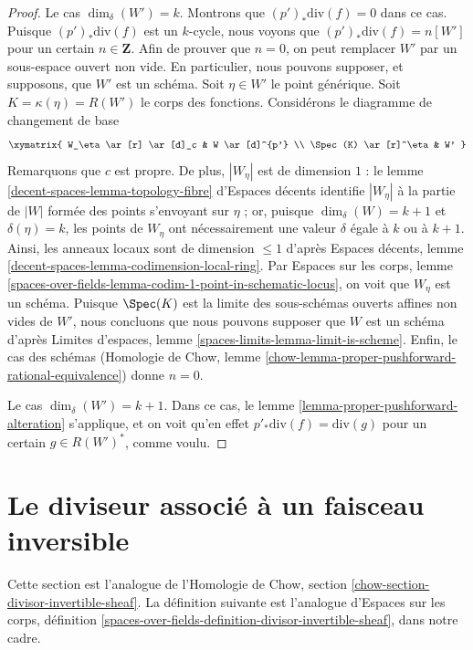 \begin{proof}
\medskip\noindent
Le cas $\dim_\delta(W') = k$. Montrons que $(p')_*\text{div}(f) = 0$ dans ce
cas. Puisque $(p')_*\text{div}(f)$ est un $k$-cycle, nous voyons que
$(p')_*\text{div}(f) = n[W']$ pour un certain $n \in \mathbf{Z}$. Afin de
prouver que $n = 0$, on peut remplacer $W'$ par un sous-espace ouvert non vide.
En particulier, nous pouvons supposer, et supposons, que $W'$ est
un schéma. Soit $\eta \in W'$ le point générique. Soit $K = \kappa(\eta) =
R(W')$ le corps des fonctions. Considérons le diagramme de changement de base
$$
\xymatrix{
W_\eta \ar[r] \ar[d]_c & W \ar[d]^{p'} \\
\Spec(K) \ar[r]^\eta & W'
}
$$
Remarquons que $c$ est propre. De plus, $|W_\eta|$ est de dimension $1$ : le
lemme \ref{decent-spaces-lemma-topology-fibre} d'Espaces décents identifie
$|W_\eta|$ à la partie de $|W|$ formée des points s'envoyant sur $\eta$ ; or,
puisque $\dim_\delta(W) = k + 1$ et $\delta(\eta) = k$, les points de
$W_\eta$ ont nécessairement une valeur $\delta$ égale à $k$ ou à $k + 1$.
Ainsi, les anneaux locaux sont de dimension $\leq 1$ d'après Espaces décents, lemme
\ref{decent-spaces-lemma-codimension-local-ring}. Par Espaces sur les corps,
lemme \ref{spaces-over-fields-lemma-codim-1-point-in-schematic-locus}, on voit
que $W_\eta$ est un schéma. Puisque $\Spec(K)$ est la limite des
sous-schémas ouverts affines non vides de $W'$, nous concluons que nous
pouvons supposer que $W$ est un schéma d'après Limites d'espaces, lemme
\ref{spaces-limits-lemma-limit-is-scheme}. Enfin, le cas des schémas
(Homologie de Chow, lemme
\ref{chow-lemma-proper-pushforward-rational-equivalence}) donne $n = 0$.

\medskip\noindent
Le cas $\dim_\delta(W') = k + 1$. Dans ce cas, le lemme
\ref{lemma-proper-pushforward-alteration} s'applique, et on voit qu'en effet
$p'_*\text{div}(f) = \text{div}(g)$ pour un certain $g \in R(W')^*$, comme
voulu.
\end{proof}












\section{Le diviseur associé à un faisceau inversible}
\label{section-divisor-invertible-sheaf}

\noindent
Cette section est l'analogue de l'Homologie de Chow, section
\ref{chow-section-divisor-invertible-sheaf}. La définition suivante est
l'analogue d'Espaces sur les corps, définition
\ref{spaces-over-fields-definition-divisor-invertible-sheaf}, dans notre cadre.

